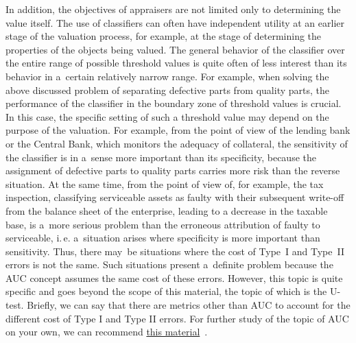 \documentclass[]{scrreprt}
\begin{document}
In addition, the objectives of appraisers are not limited only to determining the value itself. The use of classifiers can often have independent utility at an earlier stage of the valuation process, for example, at the stage of determining the properties of the objects being valued. The general behavior of the classifier over the entire range of possible threshold values is quite often of less interest than its behavior in a~certain relatively narrow range. For example, when solving the above discussed problem of separating defective parts from quality parts, the performance of the classifier in the boundary zone of threshold values is crucial. In this case, the specific setting of such a threshold value may depend on the purpose of the valuation. For example, from the point of view of the lending bank or the Central Bank, which monitors the adequacy of collateral, the sensitivity of the classifier is in a~sense more important than its specificity, because the assignment of defective parts to quality parts carries more risk than the reverse situation. At the same time, from the point of view of, for example, the tax inspection, classifying serviceable assets as faulty with their subsequent write-off from the balance sheet of the enterprise, leading to a decrease in the taxable base, is a~more serious problem than the erroneous attribution of faulty to serviceable, i.\,e. a~situation arises where specificity is more important than sensitivity. Thus, there may~be situations where the cost of Type~I and Type~II errors is not the same. Such situations present a~definite problem because the AUC concept assumes the same cost of these errors. However, this topic is quite specific and goes beyond the scope of this material, the topic of which is the U-test. Briefly, we can say that there are metrics other than AUC to account for the different cost of Type I and Type II errors. For further study of the topic of AUC on your own, we can recommend \href{http://nicolas.kruchten.com/content/2016/01/ml-meets-economics/}{this material}~\cite{ML-meets-economics}.
%

\nocite{Essential-Statistical-Inference}
\nocite{AUC-optimization}
\nocite{Mann-Whitney-1947}
\nocite{Optimizing-classifier-performance}
\nocite{ROC-R-1}
\nocite{ROC-AUC-1}
\nocite{ROC-AUC-meets-U-R-1}

\printbibliography
\end{document}
